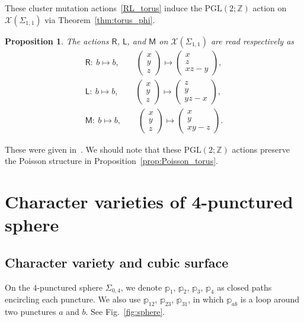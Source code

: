 \documentclass[10pt,a4paper]{amsart}
\numberwithin{equation}{section}
\newtheorem{Proposition}[Theorem]{Proposition}
 { \theoremstyle{definition}
\newtheorem{Definition}[Theorem]{Definition}
\newtheorem{Note}[Theorem]{Note}
\newtheorem{Example}[Theorem]{Example}
\newtheorem{Remark}[Theorem]{Remark} }
\begin{document}
These cluster mutation actions~\eqref{RL_torus} induce the $\mathrm{PGL}(2;\mathbb{Z})$ action on $\mathcal{X}(\Sigma_{1,1})$ via Theorem~\ref{thm:torus_phi}.

\begin{Proposition} The actions $\mathsf{R}$, $\mathsf{L}$, and $\mathsf{M}$
 on $\mathcal{X}(\Sigma_{1,1})$ are read respectively as
 \begin{gather*} %
 \mathsf{R} \colon \ b \mapsto b, \qquad
 \begin{pmatrix}
 x \\ y \\ z
 \end{pmatrix}
 \mapsto
 \begin{pmatrix}
 x \\
 z \\
 x z - y
 \end{pmatrix} , \\
 \mathsf{L}\colon \ b \mapsto b, \qquad
 \begin{pmatrix}
 x \\ y \\ z
 \end{pmatrix}
 \mapsto
 \begin{pmatrix}
 z \\ y \\ y z - x
 \end{pmatrix} ,\\
 \mathsf{M}\colon \ b \mapsto b,
 \qquad
 \begin{pmatrix}
 x \\ y \\ z
 \end{pmatrix}
 \mapsto
 \begin{pmatrix}
 x \\ y \\ x y - z
 \end{pmatrix} .
 \end{gather*}
\end{Proposition}
These were given in~\cite{WGold03a}. We should note that these $\mathrm{PGL}(2;\mathbb{Z})$ actions preserve the Poisson structure in Proposition~\ref{prop:Poisson_torus}.

\section{Character varieties of 4-punctured sphere}\label{sec:sphere}

\subsection{Character variety and cubic surface}
On the $4$-punctured sphere $\Sigma_{0,4}$, we denote $\mathbb{p}_1$, $\mathbb{p}_2$, $\mathbb{p}_3$, $\mathbb{p}_4$ as closed paths encircling each puncture. We also use $\mathbb{p}_{12}$, $\mathbb{p}_{23}$, $\mathbb{p}_{31}$, in which $\mathbb{p}_{ab}$ is a loop around two punctures $a$ and $b$. See Fig.~\ref{fig:sphere}.
\end{document}
